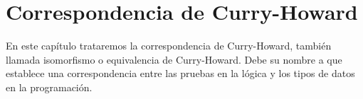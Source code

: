 \chapter{Correspondencia de Curry-Howard}

En este capítulo trataremos la correspondencia de Curry-Howard, también llamada isomorfismo o equivalencia de Curry-Howard. Debe su nombre a que establece una correspondencia entre las pruebas en la lógica y los tipos de datos en la programación. 



